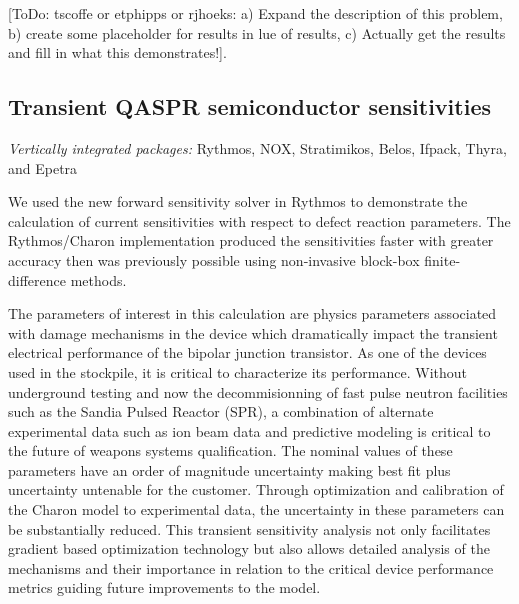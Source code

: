 \documentclass[pdf,ps2pdf,11pt]{SANDreport}
\begin{document}
[ToDo: tscoffe or etphipps or rjhoeks: a) Expand the description of this
problem, b) create some placeholder for results in lue of results, c) Actually
get the results and fill in what this demonstrates!].



%
\subsection{Transient QASPR semiconductor sensitivities}
%

{}\noindent\textit{Vertically integrated packages:} Rythmos, NOX, Stratimikos,
Belos, Ifpack, Thyra, and Epetra

We used the new forward sensitivity solver in Rythmos to demonstrate the
calculation of current sensitivities with respect to defect reaction
parameters.  The Rythmos/Charon implementation produced the sensitivities
faster with greater accuracy then was previously possible using non-invasive
block-box finite-difference methods.

The parameters of interest in this calculation are physics parameters associated
with damage mechanisms in the device which dramatically impact the transient
electrical performance of the bipolar junction transistor.  As one of the 
devices used in the stockpile, it is critical to characterize its performance.
Without underground testing and now the decommisionning of fast pulse
neutron facilities such as the Sandia Pulsed Reactor (SPR), a combination of
alternate experimental data such as ion beam data and predictive modeling
is critical to the future of weapons systems qualification.  The nominal values
of these parameters have an order of magnitude uncertainty making best fit
plus uncertainty untenable for the customer.  Through optimization and calibration
of the Charon model to experimental data, the uncertainty in these parameters
can be substantially reduced.  This transient sensitivity analysis not only
facilitates gradient based optimization technology but also allows detailed
analysis of the mechanisms and their importance in relation to the critical
device performance metrics guiding future improvements to the model.


\end{document}
